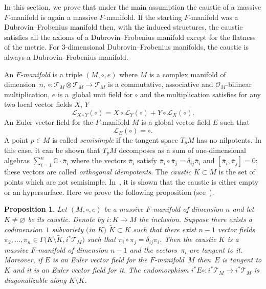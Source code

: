 \documentclass[pdftex]{sigma}
\numberwithin{equation}{section}
\newtheorem{Proposition}[Theorem]{Proposition}
 { \theoremstyle{definition}
\newtheorem{Definition}[Theorem]{Definition}
\newtheorem{Note}[Theorem]{Note}
\newtheorem{Example}[Theorem]{Example}
\newtheorem{Remark}[Theorem]{Remark} }
\begin{document}
In this section, we prove that under the main assumption the caustic of a massive $F$-manifold is again a massive $F$-manifold. If the starting $F$-manifold was a Dubrovin--Frobenius manifold then, with the induced structures, the caustic satisfies all the axioms of a Dubrovin--Frobenius manifold except for the flatness of the metric. For $3$-dimensional Dubrovin--Frobenius manifolds, the caustic is always a Dubrovin--Frobenius manifold.
\begin{Definition}
 An \emph{$F$-manifold} is a triple $(M,\circ,e)$ where $M$ is a complex manifold of dimension~$n$, $\circ\colon\mathcal{T}_{M}\otimes\mathcal{T}_{M}\rightarrow\mathcal{T}_{M}$ is a commutative, associative and $\mathcal{O}_{M}$-bilinear multiplication, $e$ is a~global unit field for $\circ$ and the multiplication satisfies for any two local vector fields $X$, $Y$
 \begin{equation}
 \label{eq:Compatibility}
 \mathcal{L}_{X\circ Y} ( \circ ) = X\circ\mathcal{L}_{ Y} ( \circ ) + Y\circ\mathcal{L}_{X} ( \circ ).
 \end{equation}
 An Euler vector field for the $F$-manifold $M$ is a global vector field $E$ such that
 \begin{equation}
 \label{eq:Euler}
 \mathcal{L}_{E}( \circ )= \circ.
 \end{equation}
 A point $p\in M$ is called \emph{semisimple} if the tangent space $T_{p}M$ has no nilpotents. In this case, it can be shown that $T_{p}M$ decomposes as a sum of one-dimensional algebras $\sum_{i=1}^{n}\mathbb{C}\cdot \bar{\pi}_{i}$ where the vectors $\bar{\pi}_{i}$ satisfy $\bar{\pi}_{i}\circ\bar{\pi}_{j}=\delta_{ij}\bar{\pi}_{i}$ and $[\bar{\pi}_{i},\bar{\pi}_{j}]=0$; these vectors are called \emph{orthogonal idempotents}. The \emph{caustic} $K\subset M$ is the set of points which are not semisimple. In~\cite[Proposition~2.6]{HertlingFrobenius}, it is shown that the caustic is either empty or an hypersurface.
 Here we prove the following proposition (see~\cite{Strachan_2004}).
\end{Definition}
\begin{Proposition}
 \label{prop:F-Caustic}
 Let $(M,\circ,e)$ be a massive $F$-manifold of dimension $n$ and let $K\neq\varnothing$ be its caustic. Denote by $i\colon K\rightarrow M$ the inclusion. Suppose there exists a codimension~$1$ subvariety $($in $K)$ $\tilde{K}\subset K$ such that there exist $n-1$ vector fields $\pi_{2},\dots,\pi_{n}\in\Gamma\bigl(K\setminus\tilde{K}, i^{*}\mathcal{T}_{M}\bigr)$ such that $\pi_{i}\circ\pi_{j}=\delta_{ij}\pi_{i}$. Then the caustic $K$ is a massive $F$-manifold of dimension $n-1$ and the vectors~$\pi_{i}$ are tangent to it. Moreover, if $E$ is an Euler vector field for the $F$-manifold~$M$ then~$E$ is tangent to $K$ and it is an Euler vector field for it. The endomorphism $i^{*}E\circ\colon i^{*}\mathcal{T}_{M}\rightarrow i^{*}\mathcal{T}_{M}$ is diagonalizable along $K\setminus\tilde{K}$.
\end{Proposition}
\end{document}
